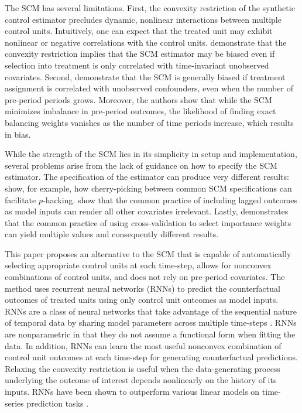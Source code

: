 The SCM has several limitations. First, the convexity restriction of the synthetic control estimator precludes dynamic, nonlinear interactions between multiple control units. Intuitively, one can expect that the treated unit may exhibit nonlinear or negative correlations with the control units. \citet{ferman2016revisiting} demonstrate that the convexity restriction implies that the SCM estimator may be biased even if selection into treatment is only correlated with time-invariant unobserved covariates. Second, \citet{ferman2018synthetic} demonstrate that the SCM is generally biased if treatment assignment is correlated with unobserved confounders, even when the number of pre-period periods grows. Moreover, the authors show that while the SCM minimizes imbalance in pre-period outcomes, the likelihood of finding exact balancing weights vanishes as the number of time periods increase, which results in bias. 

While the strength of the SCM lies in its simplicity in setup and implementation, several problems arise from the lack of guidance on how to specify the SCM estimator. The specification of the estimator can produce very different results: \citet{ferman2018cherry} show, for example, how cherry-picking between common SCM specifications can facilitate $p$-hacking. \citet{kaul2015synthetic} show that the common practice of including lagged outcomes as model inputs can render all other covariates irrelevant. Lastly, \citet{klossner2017comparative} demonstrates that the common practice of using cross-validation to select importance weights can yield multiple values and consequently different results. 

This paper proposes an alternative to the SCM that is capable of automatically selecting appropriate control units at each time-step, allows for nonconvex combinations of control units, and does not rely on pre-period covariates. The method uses recurrent neural networks (RNNs) to predict the counterfactual outcomes of treated units using only control unit outcomes as model inputs. RNNs are a class of neural networks that take advantage of the sequential nature of temporal data by sharing model parameters across multiple time-steps \citep{el1995}. RNNs are nonparametric in that they do not assume a functional form when fitting the data. In addition, RNNs can learn the most useful nonconvex combination of control unit outcomes at each time-step for generating counterfactual predictions. Relaxing the convexity restriction is useful when the data-generating process underlying the outcome of interest depends nonlinearly on the history of its inputs. RNNs have been shown to outperform various linear models on time-series prediction tasks \citep{cinar2017position}. 

